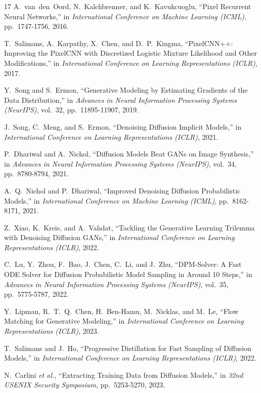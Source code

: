 \documentclass[10pt,a4paper]{article}
\begin{document}
\begin{thebibliography}{17}
A.~van~den~Oord, N.~Kalchbrenner, and K.~Kavukcuoglu, ``Pixel Recurrent Neural Networks,'' in \textit{International Conference on Machine Learning (ICML)}, pp.~1747-1756, 2016.

T.~Salimans, A.~Karpathy, X.~Chen, and D.~P.~Kingma, ``PixelCNN++: Improving the PixelCNN with Discretized Logistic Mixture Likelihood and Other Modifications,'' in \textit{International Conference on Learning Representations (ICLR)}, 2017.

Y.~Song and S.~Ermon, ``Generative Modeling by Estimating Gradients of the Data Distribution,'' in \textit{Advances in Neural Information Processing Systems (NeurIPS)}, vol.~32, pp.~11895-11907, 2019.

J.~Song, C.~Meng, and S.~Ermon, ``Denoising Diffusion Implicit Models,'' in \textit{International Conference on Learning Representations (ICLR)}, 2021.

P.~Dhariwal and A.~Nichol, ``Diffusion Models Beat GANs on Image Synthesis,'' in \textit{Advances in Neural Information Processing Systems (NeurIPS)}, vol.~34, pp.~8780-8794, 2021.

A.~Q.~Nichol and P.~Dhariwal, ``Improved Denoising Diffusion Probabilistic Models,'' in \textit{International Conference on Machine Learning (ICML)}, pp.~8162-8171, 2021.

Z.~Xiao, K.~Kreis, and A.~Vahdat, ``Tackling the Generative Learning Trilemma with Denoising Diffusion GANs,'' in \textit{International Conference on Learning Representations (ICLR)}, 2022.

C.~Lu, Y.~Zhou, F.~Bao, J.~Chen, C.~Li, and J.~Zhu, ``DPM-Solver: A Fast ODE Solver for Diffusion Probabilistic Model Sampling in Around 10 Steps,'' in \textit{Advances in Neural Information Processing Systems (NeurIPS)}, vol.~35, pp.~5775-5787, 2022.

Y.~Lipman, R.~T.~Q.~Chen, H.~Ben-Hamu, M.~Nicklas, and M.~Le, ``Flow Matching for Generative Modeling,'' in \textit{International Conference on Learning Representations (ICLR)}, 2023.

T.~Salimans and J.~Ho, ``Progressive Distillation for Fast Sampling of Diffusion Models,'' in \textit{International Conference on Learning Representations (ICLR)}, 2022.

N.~Carlini \textit{et al.}, ``Extracting Training Data from Diffusion Models,'' in \textit{32nd USENIX Security Symposium}, pp.~5253-5270, 2023.

\end{thebibliography}
\end{document}

